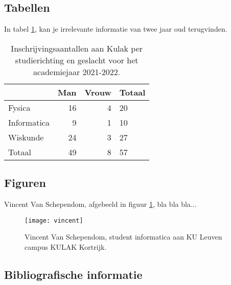 \documentclass{kulakarticle}
\begin{document}
	\subsection{Tabellen}
	
	In tabel \ref{tabel:inschrijvingen}, kan je irrelevante informatie van twee jaar oud terugvinden.
	
	\begin{table}
		\centering
		\begin{tabular}{l | r r | l}
			& Man & Vrouw & Totaal  \\ \hline
			Fysica      & 16  & 4     & 20 \\
			Informatica & 9   & 1     & 10 \\
			Wiskunde    & 24  & 3     & 27 \\ \hline
			Totaal      & 49  & 8     & 57
		\end{tabular}
		\caption{Inschrijvingsaantallen aan Kulak per studierichting en geslacht voor het academiejaar 2021-2022.}
		\label{tabel:inschrijvingen}
	\end{table}
	
	\subsection{Figuren}
	
	Vincent Van Schependom, afgebeeld in figuur \ref{fig:vincent}, bla bla bla...
	
	\begin{figure}
		\centering
		\texttt{[image: vincent]}
		\caption{Vincent Van Schependom, student informatica aan KU Leuven campus KULAK Kortrijk.}
		\label{fig:vincent}
	\end{figure}
	
	\subsection{Bibliografische informatie}
	
\end{document}
